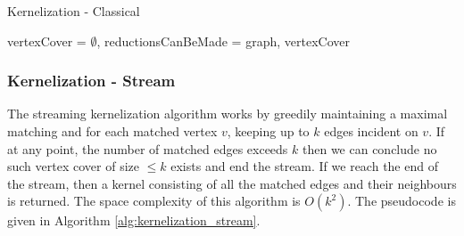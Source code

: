 \begin{algorithm}[htb]
    \caption{Kernelization - Classical}
    \label{alg:kernelization_classical}
    \DontPrintSemicolon



    vertexCover = $\emptyset$, reductionsCanBeMade = \KwTrue\;
    \Return graph, vertexCover\;
\end{algorithm}

\subsubsection{Kernelization - Stream}

The streaming kernelization algorithm works by greedily maintaining a maximal
matching and for each matched vertex \(v\), keeping up to \(k\) edges incident
on \(v\). If at any point, the number of matched edges exceeds \(k\) then we
can conclude no such vertex cover of size \(\leq k\) exists and end the stream.
If we reach the end of the stream, then a kernel consisting of all the matched
edges and their neighbours is returned. The space complexity of this algorithm
is \(O(k^2)\). The pseudocode is given in Algorithm
\ref{alg:kernelization_stream}.

